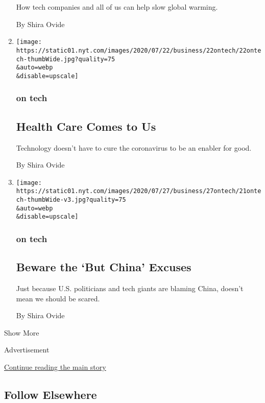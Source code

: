 \begin{enumerate}
  How tech companies and all of us can help slow global warming.

  By Shira Ovide
\item
  \href{/2020/07/22/technology/coronavirus-telemedicine.html}{}

  \texttt{[image: https://static01.nyt.com/images/2020/07/22/business/22ontech/22ontech-thumbWide.jpg?quality=75\\\&auto=webp\\\&disable=upscale]}

  \hypertarget{on-tech-7}{%
  \subsubsection{on tech}\label{on-tech-7}}

  \hypertarget{health-care-comes-to-us}{%
  \subsection{Health Care Comes to Us}\label{health-care-comes-to-us}}

  Technology doesn't have to cure the coronavirus to be an enabler for
  good.

  By Shira Ovide
\item
  \href{/2020/07/21/technology/us-china-technology.html}{}

  \texttt{[image: https://static01.nyt.com/images/2020/07/27/business/27ontech/21ontech-thumbWide-v3.jpg?quality=75\\\&auto=webp\\\&disable=upscale]}

  \hypertarget{on-tech-8}{%
  \subsubsection{on tech}\label{on-tech-8}}

  \hypertarget{beware-the-but-china-excuses}{%
  \subsection{Beware the `But China'
  Excuses}\label{beware-the-but-china-excuses}}

  Just because U.S. politicians and tech giants are blaming China,
  doesn't mean we should be scared.

  By Shira Ovide
\end{enumerate}

Show More

Advertisement

\protect\hyperlink{after-mid2}{Continue reading the main story}

\hypertarget{follow-elsewhere}{%
\subsection{Follow Elsewhere}\label{follow-elsewhere}}

